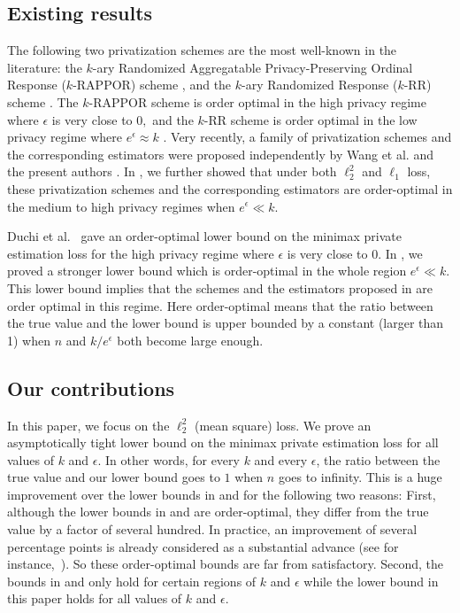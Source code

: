 \documentclass[11pt,onecolumn]{IEEEtran}
\begin{document}
\subsection{Existing results}\label{sec:existing} The following two privatization schemes are the most well-known in the literature: the $k$-ary Randomized Aggregatable Privacy-Preserving Ordinal Response ($k$-RAPPOR) scheme \cite{Duchi13a, Erlingsson14}, and the $k$-ary Randomized Response ($k$-RR) scheme
\cite{Warner65,Kairouz14}.
The $k$-RAPPOR scheme is order optimal in the high privacy regime where $\epsilon$ is very close to $0,$
and the $k$-RR scheme is order optimal in the low privacy regime where $e^{\epsilon} \approx k$ \cite{Kairouz16}. 
Very recently, a family of privatization schemes and the corresponding estimators were proposed independently by Wang et al. \cite{Wang16} and the present authors \cite{Ye17}. In \cite{Ye17}, we further showed that
under both $\ell_2^2$ and $\ell_1$ loss, these privatization schemes and the corresponding estimators are order-optimal in the medium to high privacy regimes when $e^{\epsilon} \ll k.$

Duchi et al.~\cite{Duchi16} gave an order-optimal lower bound on the minimax private estimation loss for the high privacy regime where $\epsilon$ is very close to $0$. In \cite{Ye17}, we proved a stronger lower bound which is order-optimal in the whole region $e^{\epsilon} \ll k$. This lower bound implies that the schemes and the estimators proposed in \cite{Wang16,Ye17} are order optimal in this regime.   
Here order-optimal means that the ratio between the true value and the lower bound is upper bounded by a constant (larger than 1) when $n$ and $k/e^{\epsilon}$ both become large enough.

\subsection{Our contributions}
In this paper, we focus on the $\ell_2^2$ (mean square) loss. We prove an asymptotically tight lower bound on the minimax private estimation loss for all values of $k$ and $\epsilon$. In other words, for every $k$ and every $\epsilon$, the ratio between the true value and our lower bound goes to $1$ when $n$ goes to infinity. This is a huge improvement over the lower bounds in \cite{Ye17} and \cite{Duchi16} for the following two reasons: First, although the lower bounds in \cite{Ye17} and \cite{Duchi16} are order-optimal, they differ from the true value by a factor of several hundred. In practice, an improvement of several percentage points is already considered as a substantial advance (see for instance,~\cite{Kairouz16}). So these order-optimal bounds are far from satisfactory. Second, the bounds in \cite{Ye17} and \cite{Duchi16} only hold for certain regions of $k$ and $\epsilon$ while the lower bound in this paper holds for all values of $k$ and $\epsilon$.
\end{document}
